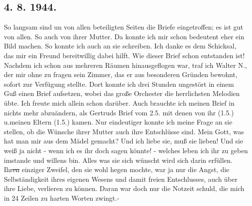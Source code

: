 \subsection{4. 8. 1944.}

So langsam sind un von allen beteiligten Seiten die Briefe eingetroffen; es ist gut von allen.
So auch von ihrer Mutter.
Da konnte ich mir schon bedeutent eher ein Bild machen.
So konnte ich auch an sie schreiben.
Ich danke es dem Schicksal, das mir ein Freund bereitwillig dabei hilft.
Wie dieser Brief schon entstanden ist!
Nachdem ich schon aus mehreren R\"{a}umen hinausgeflogen war, traf ich Walter N., der mir ohne zu fragen sein Zimmer, das er aus besonderen Gr\"{u}nden bewohnt, sofort zur Verf\"{u}gung stellte.
Dort konnte ich drei Stunden ungest\"{o}rt in einem Gu{\ss} einen Brief aufsetzen, wobei das gro{\ss}e Orchester die herrlichsten Melodien \"{u}bte.
Ich freute mich allein schon dar\"{u}ber.
Auch brauchte ich meinen Brief in nichts mehr abzu\"{a}ndern, als Gertruds Brief vom 2.5. mit denen von ihr (1.5.) u.meinen Eltern (1.5.) kamen.
Nur eindeutiger konnte ich meine Frage an sie stellen, ob die W\"{u}nsche ihrer Mutter auch ihre Entschl\"{u}sse sind.
Mein Gott, was hat man mir aus dem M\"{a}del gemacht?
Und ich liebe sie, mu{\ss} sie lieben!
Und sie wei{\ss} ja nicht - wenn ich es ihr doch sagen k\"{o}nnte! - welches leben ich ihr zu geben imstande und willens bin.
Alles was sie sich w\"{u}nscht wird sich darin erf\"{u}llen.
Ihr\st{en} einziger Zweifel, den sie wohl hegen mochte, war ja nur die Angst, die Selbst\"{a}ndigkeit ihres eigenen Wesens und damit freien Entschlusses, auch \"{u}ber ihre Liebe, verlieren zu k\"{o}nnen.
Daran war doch nur die Notzeit schuld, die mich in 24 Zeilen zu harten Worten zwingt.-

\clearpage
